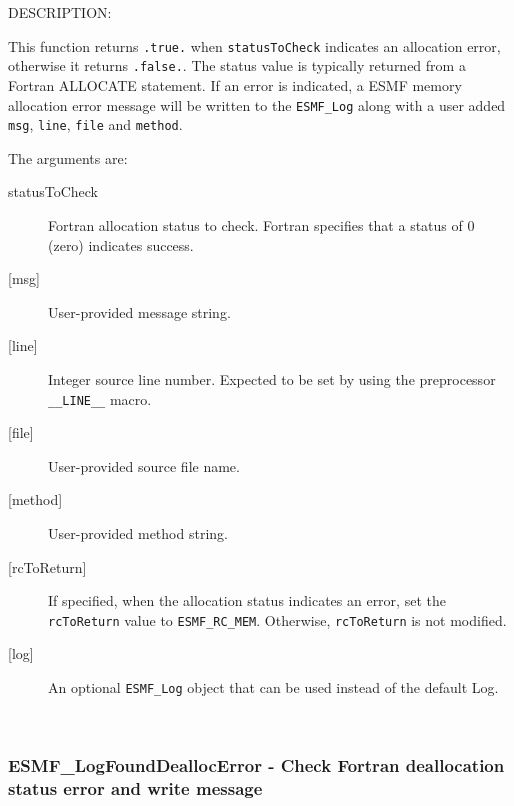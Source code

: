 {\sf DESCRIPTION:\\ }


        This function returns {\tt .true.} when {\tt statusToCheck} indicates
        an allocation error, otherwise it returns {\tt .false.}.  The status
        value is typically returned from a Fortran ALLOCATE statement.
        If an error is indicated, a ESMF memory allocation error message
        will be written to the {\tt ESMF\_Log} along with a user added {\tt msg},
        {\tt line}, {\tt file} and {\tt method}.
  
        The arguments are:
        \begin{description}
  
        \item [statusToCheck]
              Fortran allocation status to check.  Fortran specifies
              that a status of 0 (zero) indicates success.
        \item [{[msg]}]
              User-provided message string.
        \item [{[line]}]
              Integer source line number.  Expected to be set by
              using the preprocessor {\tt \_\_LINE\_\_} macro.
        \item [{[file]}]
              User-provided source file name.
        \item [{[method]}]
              User-provided method string.
        \item [{[rcToReturn]}]
              If specified, when the allocation status indicates an error,
              set the {\tt rcToReturn} value to {\tt ESMF\_RC\_MEM}.  Otherwise,
              {\tt rcToReturn} is not modified.
        \item [{[log]}]
              An optional {\tt ESMF\_Log} object that can be used instead
              of the default Log.
  
        \end{description}
   
 
\mbox{}\hrulefill\ 
 
\subsubsection [ESMF\_LogFoundDeallocError] {ESMF\_LogFoundDeallocError - Check Fortran deallocation status error and write message}



